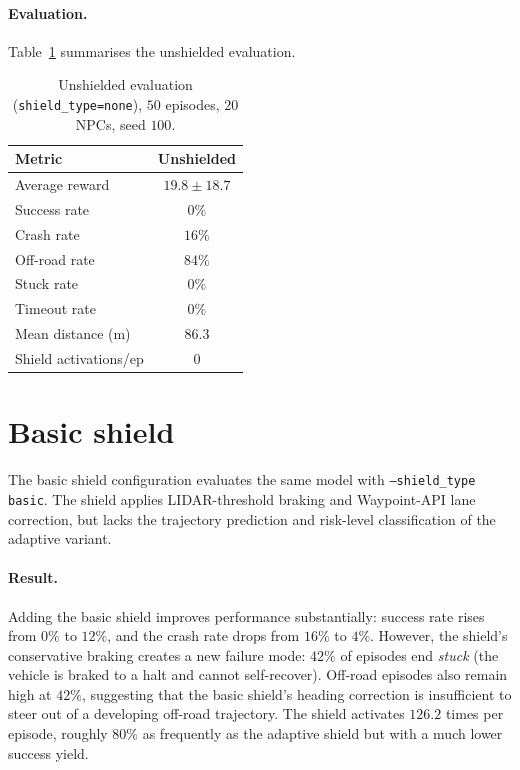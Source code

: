 \paragraph{Evaluation.}
Table~\ref{tab:baseline-eval} summarises the unshielded evaluation.

\begin{table}[H]
  \centering
  \caption{Unshielded evaluation (\texttt{shield\_type=none}), \(50\) episodes,
           \(20\) NPCs, seed \(100\).}
  \label{tab:baseline-eval}
  \small
  \begin{tabular}{@{}lc@{}}
    \toprule
    \textbf{Metric} & \textbf{Unshielded} \\
    \midrule
    Average reward        & $19.8 \pm 18.7$ \\
    Success rate          & $0\%$ \\
    Crash rate            & $16\%$ \\
    Off-road rate         & $84\%$ \\
    Stuck rate            & $0\%$ \\
    Timeout rate          & $0\%$ \\
    Mean distance (m)     & $86.3$ \\
    Shield activations/ep & $0$ \\
    \bottomrule
  \end{tabular}
\end{table}

\section{Basic shield}\label{sec:exp-basic}

The basic shield configuration evaluates the same model with
\texttt{--shield\_type basic}. The shield applies LIDAR-threshold braking and
Waypoint-API lane correction, but lacks the trajectory prediction and risk-level
classification of the adaptive variant.

\paragraph{Result.}
Adding the basic shield improves performance substantially: success rate rises from
\(0\%\) to \(12\%\), and the crash rate drops from \(16\%\) to \(4\%\). However, the
shield's conservative braking creates a new failure mode: \(42\%\) of episodes end
\emph{stuck} (the vehicle is braked to a halt and cannot self-recover). Off-road episodes
also remain high at \(42\%\), suggesting that the basic shield's heading correction is
insufficient to steer out of a developing off-road trajectory. The shield activates
\(126.2\) times per episode, roughly \(80\%\) as frequently as the adaptive shield but
with a much lower success yield.

